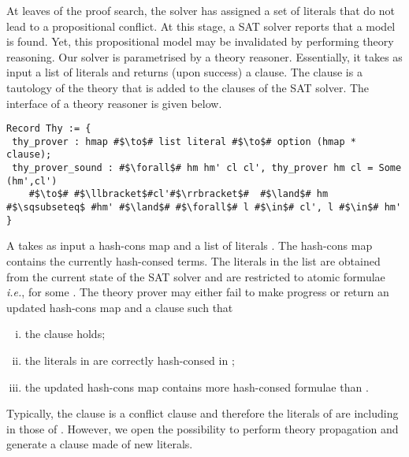\documentclass[utf8,a4paper,UKenglish,cleveref, autoref, thm-restate]{lipics-v2021}
\begin{document}
At leaves of the proof search, the solver has assigned a set of
literals that do not lead to a propositional conflict. At this stage, a
SAT solver reports that a model is found.
%
Yet, this propositional model may be invalidated by performing theory reasoning.
%
Our solver is parametrised by a theory reasoner. Essentially, it takes
as input a list of literals and returns (upon success) a clause. The
clause is a tautology of the theory that is added to the clauses of
the SAT solver.
%
The interface of a theory reasoner is given below.
\begin{verbatim}
Record Thy := {
 thy_prover : hmap #$\to$# list literal #$\to$# option (hmap * clause);
 thy_prover_sound : #$\forall$# hm hm' cl cl', thy_prover hm cl = Some (hm',cl')
    #$\to$# #$\llbracket$#cl'#$\rrbracket$#  #$\land$# hm #$\sqsubseteq$ #hm' #$\land$# #$\forall$# l #$\in$# cl', l #$\in$# hm'  }
\end{verbatim}
A  takes as input a hash-cons map  and a
list of literals .  The hash-cons map  contains the
currently hash-consed terms. The literals in the list  are
obtained from the current state of the SAT solver and are restricted
to atomic formulae \emph{i.e.},  for some .
%
The theory prover may either fail to make progress or return an
updated hash-cons map  and a clause  such that
\begin{enumerate}[i)]
\item the clause  holds;
\item the literals in  are correctly hash-consed in ;
\item the updated hash-cons map  contains more hash-consed formulae than .
\end{enumerate}
Typically, the clause  is a conflict clause and therefore
the literals of  are including in those of
. However, we open the possibility to perform theory
propagation and generate a clause made of new literals.
%
\end{document}
